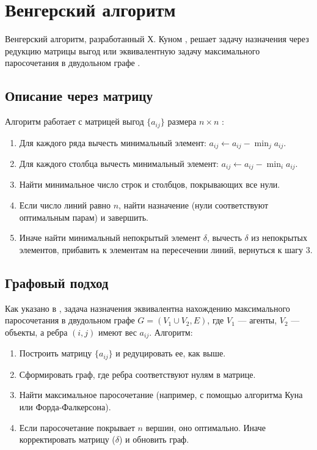 \section{Венгерский алгоритм}
Венгерский алгоритм, разработанный Х. Куном \cite{kuhn1955}, решает задачу назначения через редукцию матрицы выгод или эквивалентную задачу максимального паросочетания в двудольном графе \cite{emaxx2025}.

\subsection{Описание через матрицу}
Алгоритм работает с матрицей выгод $\{a_{ij}\}$ размера $n \times n$ \cite{kuhn1955}:
\begin{enumerate}
    \item Для каждого ряда вычесть минимальный элемент: $a_{ij} \gets a_{ij} - \min_j a_{ij}$.
    \item Для каждого столбца вычесть минимальный элемент: $a_{ij} \gets a_{ij} - \min_i a_{ij}$.
    \item Найти минимальное число строк и столбцов, покрывающих все нули.
    \item Если число линий равно $n$, найти назначение (нули соответствуют оптимальным парам) и завершить.
    \item Иначе найти минимальный непокрытый элемент $\delta$, вычесть $\delta$ из непокрытых элементов, прибавить к элементам на пересечении линий, вернуться к шагу 3.
\end{enumerate}

\subsection{Графовый подход}
Как указано в \cite{emaxx2025}, задача назначения эквивалентна нахождению максимального паросочетания в двудольном графе $G = (V_1 \cup V_2, E)$, где $V_1$ --- агенты, $V_2$ --- объекты, а ребра $(i,j)$ имеют вес $a_{ij}$. Алгоритм:
\begin{enumerate}
    \item Построить матрицу $\{a_{ij}\}$ и редуцировать ее, как выше.
    \item Сформировать граф, где ребра соответствуют нулям в матрице.
    \item Найти максимальное паросочетание (например, с помощью алгоритма Куна или Форда-Фалкерсона).
    \item Если паросочетание покрывает $n$ вершин, оно оптимально. Иначе корректировать матрицу ($\delta$) и обновить граф.
\end{enumerate}

